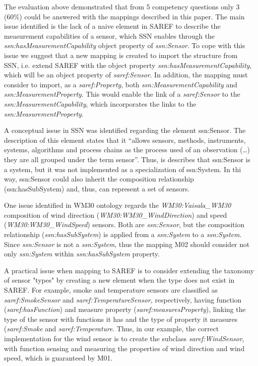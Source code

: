 \documentclass{sig-alternate-05-2015}
\begin{document}
The evaluation above demonstrated that from 5 competency questions only 3 (60\%) could be answered with the mappings described in this paper. The main issue identified is the lack of a naive element in SAREF to describe the measurement capabilities of a sensor, which SSN enables through the \textit{ssn:\-hasMeasurementCapability} object property of \textit{ssn:\-Sensor}. To cope with this issue we suggest that a new mapping is created to import the structure from SSN, i.e. extend SAREF with the object property \textit{ssn:\-has\-Measurement\-Capability}, which will be an object property of \textit{saref:\-Sensor}. In addition, the mapping must consider to import, as a \textit{saref:\-Property}, both \textit{ssn:\-Measurement\-Capability} and \textit{ssn:\-Measurement\-Property}. This would enable the link of a \textit{saref:\-Sensor} to the \textit{ssn:\-Measurement\-Capability}, which incorporates the links to the \textit{ssn:\-Measurement\-Property}. 

A conceptual issue in SSN was identified regarding the element ssn:\-Sensor. The description of this element states that it “allows sensors, methods, instruments, systems, algorithms and process chains as the process used of an observation (…) they are all grouped under the term sensor”. Thus, is describes that ssn:\-Sensor is a system, but it was not implemented as a specialization of ssn:\-System. In thi way, ssn:\-Sensor could also inherit the composition relationship (ssn:\-hasSubSystem) and, thus, can represent a set of sensors. 

One issue identified in WM30 ontology regards the \textit{WM30:\-Vaisala\-\_WM30} composition of wind direction (\textit{WM30:\-WM30\-\_Wind\-Direction}) and speed (\textit{WM30:\-WM30\-\_WindSpeed}) sensors. Both are \textit{ssn:\-Sensor}, but the composition relationship (\textit{ssn:\-hasSubSystem}) is applied from a \textit{ssn:\-System} to a \textit{ssn:\-System}. Since \textit{ssn:\-Sensor} is not a \textit{ssn:\-System}, thus the mapping M02 should consider not only \textit{ssn:\-System} within \textit{ssn:\-hasSubSystem} property. 

A practical issue when mapping to SAREF is to consider extending the taxonomy of sensor "types" by creating a new element when the type does not exist in SAREF. For example, smoke and temperature sensors are classified as \textit{saref:\-SmokeSensor} and \textit{saref:\-TemperatureSensor,} respectively, having  function (\textit{saref:\-hasFunction}) and measure property (\textit{saref:\-measuresProperty}), linking the type of the sensor with functions it has and the type of property it measures (\textit{saref:\-Smoke} and \textit{saref:\-Temperature}. Thus, in our example, the correct implementation for the wind sensor is to create the subclass \textit{saref:\-WindSensor}, with function sensing and measuring the properties of wind direction and wind speed, which is guaranteed by M01. 
\end{document}
